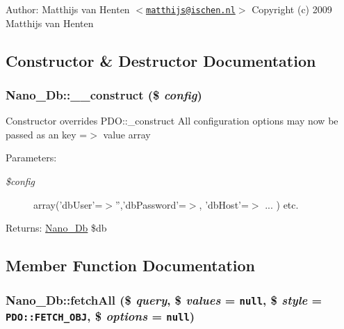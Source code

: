 \begin{Desc}
\item[Author:]Matthijs van Henten $<$\href{mailto:matthijs@ischen.nl}{\tt matthijs@ischen.nl}$>$  Copyright (c) 2009 Matthijs van Henten \end{Desc}


\subsection{Constructor \& Destructor Documentation}
\hypertarget{classNano__Db_c1d07ff4d3efcc8488ea33e88a63b1aa}{
\subsubsection[{\_\-\_\-construct}]{\setlength{\rightskip}{0pt plus 5cm}Nano\_\-Db::\_\-\_\-construct (\$ {\em config})}}
\label{classNano__Db_c1d07ff4d3efcc8488ea33e88a63b1aa}


Constructor overrides PDO::\_\-construct All configuration options may now be passed as an key =$>$ value array

\begin{Desc}
\item[Parameters:]
\begin{description}
\item[{\em \$config}]array('dbUser'=$>$'','dbPassword'=$>$, 'dbHost'=$>$ ... ) etc. \end{description}
\end{Desc}
\begin{Desc}
\item[Returns:]\hyperlink{classNano__Db}{Nano\_\-Db} \$db \end{Desc}


\subsection{Member Function Documentation}
\hypertarget{classNano__Db_c366221db547f0902a01e9e9b25de948}{
\subsubsection[{fetchAll}]{\setlength{\rightskip}{0pt plus 5cm}Nano\_\-Db::fetchAll (\$ {\em query}, \/  \$ {\em values} = {\tt null}, \/  \$ {\em style} = {\tt PDO::FETCH\_\-OBJ}, \/  \$ {\em options} = {\tt null})}}
\label{classNano__Db_c366221db547f0902a01e9e9b25de948}


